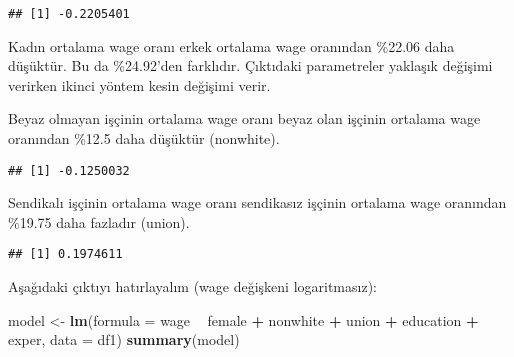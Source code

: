\documentclass[
]{book}
\newenvironment{Shaded}{\begin{snugshade}}{\end{snugshade}}
\newcommand{\DataTypeTok}[1]{\textcolor[rgb]{0.13,0.29,0.53}{#1}}
\newcommand{\DecValTok}[1]{\textcolor[rgb]{0.00,0.00,0.81}{#1}}
\newcommand{\KeywordTok}[1]{\textcolor[rgb]{0.13,0.29,0.53}{\textbf{#1}}}
\newcommand{\NormalTok}[1]{#1}
\newcommand{\OperatorTok}[1]{\textcolor[rgb]{0.81,0.36,0.00}{\textbf{#1}}}
\newcommand{\StringTok}[1]{\textcolor[rgb]{0.31,0.60,0.02}{#1}}
\begin{document}
\begin{Shaded}
\end{Shaded}

\begin{verbatim}
## [1] -0.2205401
\end{verbatim}

Kadın ortalama wage oranı erkek ortalama wage oranından \%22.06 daha düşüktür. Bu da \%24.92'den farklıdır. Çıktıdaki parametreler yaklaşık değişimi verirken ikinci yöntem kesin değişimi verir.

Beyaz olmayan işçinin ortalama wage oranı beyaz olan işçinin ortalama wage oranından \%12.5 daha düşüktür (nonwhite).

\begin{Shaded}
\end{Shaded}

\begin{verbatim}
## [1] -0.1250032
\end{verbatim}

Sendikalı işçinin ortalama wage oranı sendikasız işçinin ortalama wage oranından \%19.75 daha fazladır (union).

\begin{Shaded}
\end{Shaded}

\begin{verbatim}
## [1] 0.1974611
\end{verbatim}

Aşağıdaki çıktıyı hatırlayalım (wage değişkeni logaritmasız):

\begin{Shaded}
\begin{Highlighting}[]
\NormalTok{model <-}\StringTok{ }\KeywordTok{lm}\NormalTok{(}\DataTypeTok{formula =}\NormalTok{ wage }\OperatorTok{~}\StringTok{ }\NormalTok{female }\OperatorTok{+}\StringTok{ }\NormalTok{nonwhite }\OperatorTok{+}\StringTok{ }\NormalTok{union }\OperatorTok{+}\StringTok{ }\NormalTok{education }\OperatorTok{+}\StringTok{ }\NormalTok{exper, }\DataTypeTok{data =}\NormalTok{ df1)}
\KeywordTok{summary}\NormalTok{(model)}
\end{Highlighting}
\end{Shaded}
\end{document}
